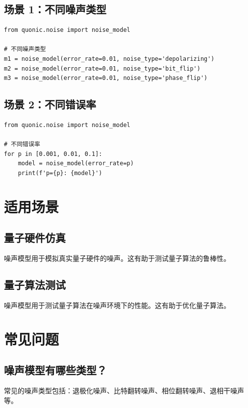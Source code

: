 \documentclass[12pt,a4paper]{article}
\begin{document}
\subsection{场景 1：不同噪声类型}

\begin{verbatim}
from quonic.noise import noise_model

# 不同噪声类型
m1 = noise_model(error_rate=0.01, noise_type='depolarizing')
m2 = noise_model(error_rate=0.01, noise_type='bit_flip')
m3 = noise_model(error_rate=0.01, noise_type='phase_flip')
\end{verbatim}

\subsection{场景 2：不同错误率}

\begin{verbatim}
from quonic.noise import noise_model

# 不同错误率
for p in [0.001, 0.01, 0.1]:
    model = noise_model(error_rate=p)
    print(f'p={p}: {model}')
\end{verbatim}

\section{适用场景}

\subsection{量子硬件仿真}

噪声模型用于模拟真实量子硬件的噪声。这有助于测试量子算法的鲁棒性。

\subsection{量子算法测试}

噪声模型用于测试量子算法在噪声环境下的性能。这有助于优化量子算法。

\section{常见问题}

\subsection{噪声模型有哪些类型？}

常见的噪声类型包括：退极化噪声、比特翻转噪声、相位翻转噪声、退相干噪声等。
\end{document}
